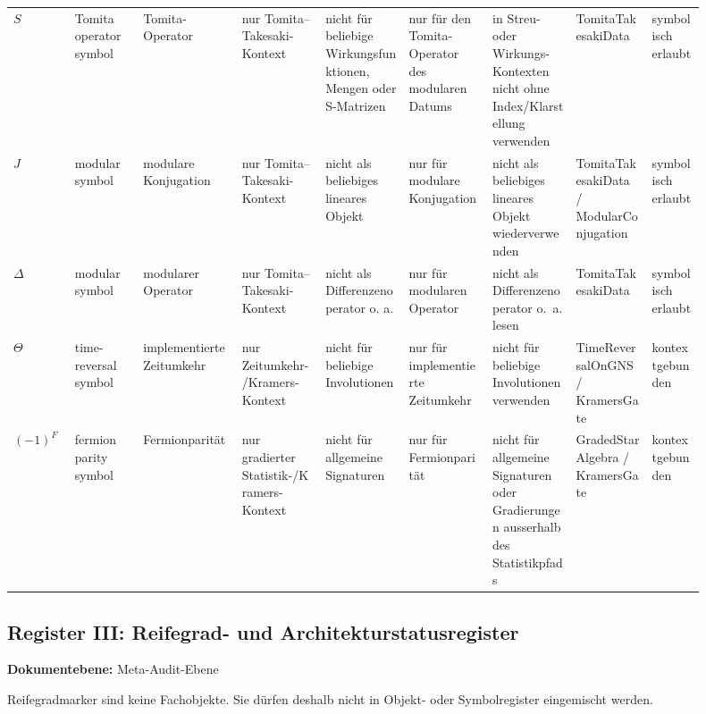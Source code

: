 \documentclass[11pt,a4paper]{article}
\newcommand{\doclevel}[1]{\par\small\noindent\textbf{Dokumentebene:} #1\par\normalsize\medskip}
\newcommand{\tablefontsize}{\fontsize{6.1}{6.8}\selectfont}
\newenvironment{wideauditlandscape}{%
  \begingroup
  \setlength{\tabcolsep}{1pt}%
  \renewcommand{\arraystretch}{0.92}%
  \tablefontsize%
  \begin{landscape}%
}{%
  \end{landscape}%
  \endgroup
  \clearpage
}
\begin{document}
\begin{wideauditlandscape}
\begin{tabular}{L{0.07\linewidth}L{0.09\linewidth}L{0.13\linewidth}L{0.11\linewidth}L{0.11\linewidth}L{0.11\linewidth}L{0.11\linewidth}L{0.10\linewidth}L{0.07\linewidth}}
$S$ & Tomita operator symbol & Tomita-Operator & nur Tomita--Takesaki-Kontext & nicht für beliebige Wirkungsfunktionen, Mengen oder S-Matrizen & nur für den Tomita-Operator des modularen Datums & in Streu- oder Wirkungs-Kontexten nicht ohne Index/Klarstellung verwenden & TomitaTakesakiData & symbolisch erlaubt \\
$J$ & modular symbol & modulare Konjugation & nur Tomita--Takesaki-Kontext & nicht als beliebiges lineares Objekt & nur für modulare Konjugation & nicht als beliebiges lineares Objekt wiederverwenden & TomitaTakesakiData / ModularConjugation & symbolisch erlaubt \\
$\Delta$ & modular symbol & modularer Operator & nur Tomita--Takesaki-Kontext & nicht als Differenzenoperator o. a. & nur für modularen Operator & nicht als Differenzenoperator o.~a. lesen & TomitaTakesakiData & symbolisch erlaubt \\
$\Theta$ & time-reversal symbol & implementierte Zeitumkehr & nur Zeitumkehr-/Kramers-Kontext & nicht für beliebige Involutionen & nur für implementierte Zeitumkehr & nicht für beliebige Involutionen verwenden & TimeReversalOnGNS / KramersGate & kontextgebunden \\
$(-1)^F$ & fermion parity symbol & Fermionparität & nur gradierter Statistik-/Kramers-Kontext & nicht für allgemeine Signaturen & nur für Fermionparität & nicht für allgemeine Signaturen oder Gradierungen ausserhalb des Statistikpfads & GradedStarAlgebra / KramersGate & kontextgebunden \\
\bottomrule
\end{tabular}
\end{wideauditlandscape}

\subsection{Register III: Reifegrad- und Architekturstatusregister}
\doclevel{Meta-Audit-Ebene}
Reifegradmarker sind keine Fachobjekte. Sie dürfen deshalb nicht in Objekt- oder Symbolregister
eingemischt werden.
\end{document}
